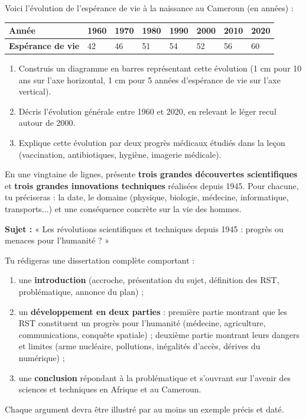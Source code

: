 \documentclass[11pt]{article}
\newcounter{popsec}
\newcounter{popsub}
\newcommand{\courssub}[1]{%
  \stepcounter{popsub}%
  \par\vspace{9pt}\noindent{\popxbold\fontsize{11.5}{13}\selectfont\color{popink}{\color{poporange}\thepopsec.\thepopsub}\hspace{6pt}#1}\par\nopagebreak\vspace{4pt}
}
\begin{document}
\begin{exercice}
Voici l'évolution de l'espérance de vie à la naissance au Cameroun (en années) :

\begin{center}
\begin{tabularx}{\linewidth}{|l|X|X|X|X|X|X|X|}
\hline
\rowcolor{popblueL} \textbf{Année} & 1960 & 1970 & 1980 & 1990 & 2000 & 2010 & 2020 \\
\hline
\textbf{Espérance de vie} & 42 & 46 & 51 & 54 & 52 & 56 & 60 \\
\hline
\end{tabularx}
\end{center}

\begin{enumerate}
\item Construis un diagramme en barres représentant cette évolution (1 cm pour 10 ans sur l'axe horizontal, 1 cm pour 5 années d'espérance de vie sur l'axe vertical).
\item Décris l'évolution générale entre 1960 et 2020, en relevant le léger recul autour de 2000.
\item Explique cette évolution par deux progrès médicaux étudiés dans la leçon (vaccination, antibiotiques, hygiène, imagerie médicale).
\end{enumerate}
\end{exercice}

\begin{exercice}
En une vingtaine de lignes, présente \textbf{trois grandes découvertes scientifiques} et \textbf{trois grandes innovations techniques} réalisées depuis 1945. Pour chacune, tu préciseras : la date, le domaine (physique, biologie, médecine, informatique, transports...) et une conséquence concrète sur la vie des hommes.
\end{exercice}

\courssub{Je me prépare au Bac}

\begin{exercice}
\textbf{Sujet :} « Les révolutions scientifiques et techniques depuis 1945 : progrès ou menaces pour l'humanité ? »

Tu rédigeras une dissertation complète comportant :
\begin{enumerate}
\item une \textbf{introduction} (accroche, présentation du sujet, définition des RST, problématique, annonce du plan) ;
\item un \textbf{développement en deux parties} : première partie montrant que les RST constituent un progrès pour l'humanité (médecine, agriculture, communications, conquête spatiale) ; deuxième partie montrant leurs dangers et limites (arme nucléaire, pollutions, inégalités d'accès, dérives du numérique) ;
\item une \textbf{conclusion} répondant à la problématique et s'ouvrant sur l'avenir des sciences et techniques en Afrique et au Cameroun.
\end{enumerate}
Chaque argument devra être illustré par au moins un exemple précis et daté.
\end{exercice}
\end{document}
